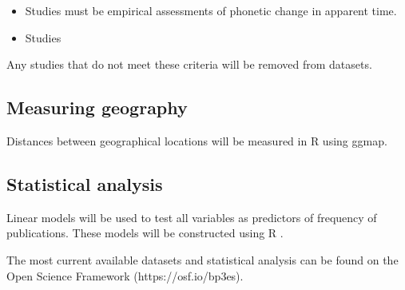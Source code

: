 \documentclass[review]{article}
\begin{document}
\begin{itemize}
	\item Studies must be empirical assessments of phonetic change in apparent time.
	\item Studies 
\end{itemize}

Any studies that do not meet these criteria will be removed from datasets.


\subsection{Measuring geography}

Distances between geographical locations will be measured in R using ggmap.



\subsection{Statistical analysis}
Linear models will be used to test all variables as predictors of frequency of publications. These models will be constructed using R \cite{R2018}.

The most current available datasets and statistical analysis can be found on the Open Science Framework (https://osf.io/bp3es). 




\end{document}
